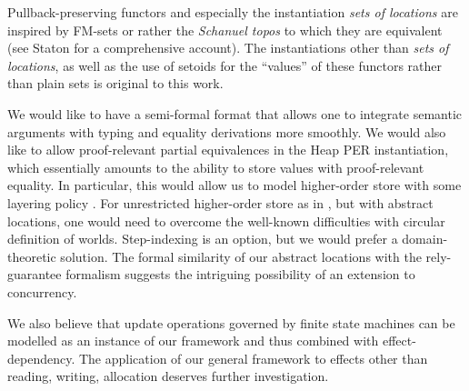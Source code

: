 \documentclass[orivec]{llncs}
\newif\iffull\fullfalse
\begin{document}
Pullback-preserving functors and especially the instantiation
\emph{sets of locations} are inspired by FM-sets 
\cite{DBLP:journals/fac/GabbayP02} or rather the \emph{Schanuel topos}
to which they are equivalent (see Staton \cite{statonphd} for a
comprehensive account). The instantiations other than \emph{sets of
  locations}, as well as the use of setoids for the ``values'' of
these functors rather than plain sets is original to this work.

\iffull
For a while we worked with groupoids instead of setoids.  At some
point though we found that the required equations between proofs are
needed only to establish other such equations, never in order to prove
something that does not mention them and we thus took the somewhat
bold step to give up all equations between proofs leading us to
setoids. Should we ever want to model dependent types where the index
types are already nontrivial setoids then the passage to groupoids would
become necessary for then, by way of substitution, equality proofs
interfere with actual (semantic) terms. E.g.\ if $p:e\sim e'$ then we
expect a function $A[p]$ from $A[e]$ to $A[e']$.
\fi

We would like to have a semi-formal format that allows one to
integrate semantic arguments with typing and equality derivations more
smoothly. We would also like to allow proof-relevant partial
equivalences in the Heap PER instantiation, which essentially amounts
to the ability to store values with proof-relevant equality. In
particular, this would allow us to model higher-order store with some
layering policy  \cite{DBLP:journals/iandc/Boudol10}. For
unrestricted higher-order store as in
\cite{DBLP:conf/icfp/ThamsborgB11}, but with abstract locations, one
would need to overcome the well-known difficulties with circular
definition of worlds. Step-indexing \cite{DBLP:conf/esop/Ahmed06} is
an option, but we would prefer a domain-theoretic solution. The formal
similarity of our abstract locations with the rely-guarantee formalism
\cite{DBLP:journals/logcom/ColemanJ07,DBLP:conf/concur/VafeiadisP07}
suggests the intriguing possibility of an extension to concurrency.

We also believe that update operations governed by finite state
machines \cite{DBLP:conf/popl/AhmedDR09} can
be modelled as an instance of our framework and thus combined with
effect-dependency. The application of our general framework to effects other
than reading, writing, allocation deserves further investigation.
\end{document}
